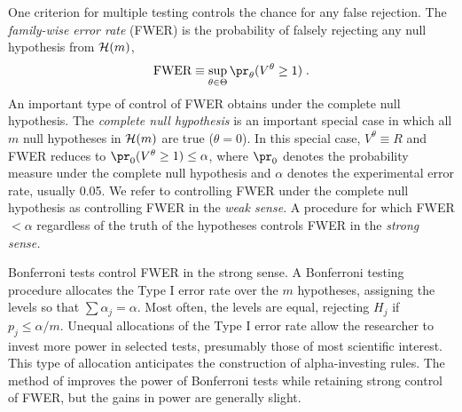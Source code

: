 \documentclass[12pt]{article}
\begin{document}
 One criterion for multiple testing controls the chance for any false rejection.
  The {\em family-wise error rate} (FWER) is the probability of falsely
 rejecting any null hypothesis from ${\cal H}(m)$,
\begin{equation}
  \mbox{FWER} \equiv \sup_{\theta \in \Theta} \pr_\theta(V^\theta \ge 1) \;.
\label{eq:fwer}
\end{equation}
 An important type of control of FWER obtains under the complete null
 hypothesis.  The {\em complete null hypothesis} is an important special case in
 which all $m$ null hypotheses in ${\cal H}(m)$ are true ($\theta = 0$).  In
 this special case, $V^\theta \equiv R$ and FWER reduces to $\pr_0(V^\theta \ge
 1) \le \alpha$, where $\pr_0$ denotes the probability measure under the
 complete null hypothesis and $\alpha$ denotes the experimental error rate,
 usually 0.05.  We refer to controlling FWER under the complete null hypothesis
 as controlling FWER in the {\em weak sense}.  A procedure for which FWER $<
 \alpha$ regardless of the truth of the hypotheses controls FWER in the {\em
 strong sense.}


 Bonferroni tests control FWER in the strong sense.  A Bonferroni testing
 procedure allocates the Type I error rate over the $m$ hypotheses, assigning
 the levels so that $\sum \alpha_j = \alpha$.  Most often, the levels are equal,
 rejecting $H_j$ if $p_j \le \alpha/m$.  Unequal allocations of the Type I error
 rate allow the researcher to invest more power in selected tests, presumably
 those of most scientific interest.  This type of allocation anticipates the
 construction of alpha-investing rules. The method of \citet{holm79} improves
 the power of Bonferroni tests while retaining strong control of FWER, but the
 gains in power are generally slight.
\end{document}

